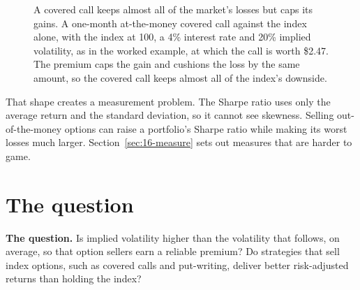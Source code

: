 \begin{figure}[htbp]
\centering
{}
\caption{A covered call keeps almost all of the market's losses but caps its gains. A one-month at-the-money covered call against the index alone, with the index at 100, a 4\% interest rate and 20\% implied volatility, as in the worked example, at which the call is worth \$2.47. The premium caps the gain and cushions the loss by the same amount, so the covered call keeps almost all of the index's downside.}
\label{fig:16-cc}
\end{figure}

That shape creates a measurement problem. The Sharpe ratio uses only the average return and the standard deviation, so it cannot see skewness. Selling out-of-the-money options can raise a portfolio's Sharpe ratio while making its worst losses much larger. Section~\ref{sec:16-measure} sets out measures that are harder to game.


\section{The question}
\label{sec:16-claim}

\begin{callout}
\textbf{The question.} Is implied volatility higher than the volatility that follows, on average, so that option sellers earn a reliable premium? Do strategies that sell index options, such as covered calls and put-writing, deliver better risk-adjusted returns than holding the index?
\end{callout}

